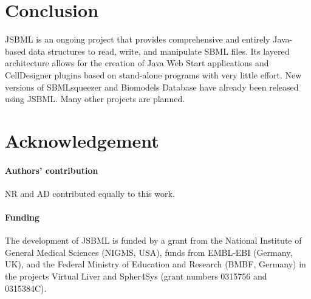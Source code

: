 \documentclass{bioinfo}
\begin{document}




\section{Conclusion}

JSBML is an ongoing project that provides comprehensive and entirely Java-based
data structures to read, write, and manipulate SBML files. Its layered
architecture allows for the creation of Java Web Start applications and
CellDesigner plugins based on stand-alone programs with very little effort.
%
New versions of SBMLsqueezer \citep{Draeger2008} and Biomodels Database
\citep{Li2010} have  already been released using JSBML. Many other projects are
planned.

\section*{Acknowledgement}

\paragraph{Authors' contribution\textcolon} NR and AD contributed equally to
this work.

\paragraph{Funding\textcolon}
The development of JSBML is funded by a grant from the National Institute of
General Medical Sciences (NIGMS, USA), funds from EMBL-EBI (Germany, UK), and
the Federal Ministry of Education and Research (BMBF, Germany) in the projects
Virtual Liver and Spher4Sys (grant numbers 0315756 and 0315384C).
\end{document}
